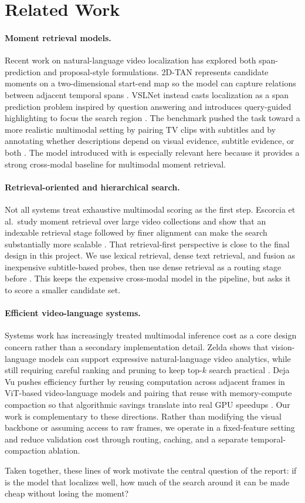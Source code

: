 \section{Related Work}
\label{sec:related-work}

\paragraph{Moment retrieval models.}
Recent work on natural-language video localization has explored both span-prediction and proposal-style formulations. 2D-TAN represents candidate moments on a two-dimensional start-end map so the model can capture relations between adjacent temporal spans \cite{zhang2019twodtan}. VSLNet instead casts localization as a span prediction problem inspired by question answering and introduces query-guided highlighting to focus the search region \cite{zhang2020vslnet}. The \dataset benchmark pushed the task toward a more realistic multimodal setting by pairing TV clips with subtitles and by annotating whether descriptions depend on visual evidence, subtitle evidence, or both \cite{lei2020tvr}. The \xml model introduced with \dataset is especially relevant here because it provides a strong cross-modal baseline for multimodal moment retrieval.

\paragraph{Retrieval-oriented and hierarchical search.}
Not all systems treat exhaustive multimodal scoring as the first step. Escorcia et al.\ study moment retrieval over large video collections and show that an indexable retrieval stage followed by finer alignment can make the search substantially more scalable \cite{escorcia2019finding}. That retrieval-first perspective is close to the final design in this project. We use lexical retrieval, dense text retrieval, and fusion as inexpensive subtitle-based probes, then use dense retrieval as a routing stage before \xml. This keeps the expensive cross-modal model in the pipeline, but asks it to score a smaller candidate set.

\paragraph{Efficient video-language systems.}
Systems work has increasingly treated multimodal inference cost as a core design concern rather than a secondary implementation detail. Zelda shows that vision-language models can support expressive natural-language video analytics, while still requiring careful ranking and pruning to keep top-$k$ search practical \cite{romero2023zelda}. Deja Vu pushes efficiency further by reusing computation across adjacent frames in ViT-based video-language models and pairing that reuse with memory-compute compaction so that algorithmic savings translate into real GPU speedups \cite{hwang2025dejavu}. Our work is complementary to these directions. Rather than modifying the visual backbone or assuming access to raw frames, we operate in a fixed-feature \dataset setting and reduce validation cost through routing, caching, and a separate temporal-compaction ablation.

Taken together, these lines of work motivate the central question of the report: if \xml is the model that localizes well, how much of the search around it can be made cheap without losing the moment?
